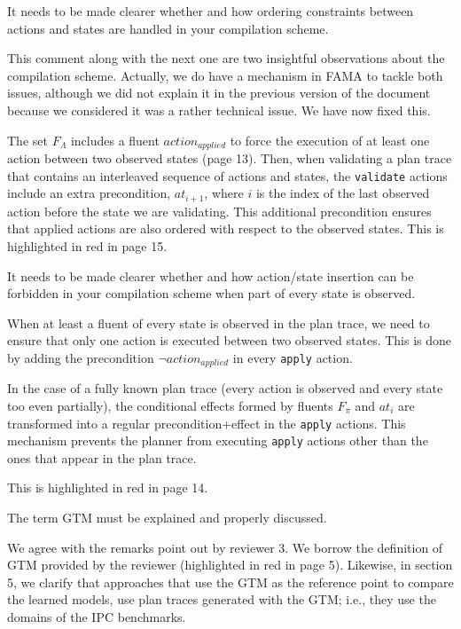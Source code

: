 \documentclass{article}
\newcommand{\FAMA}{{\small {\sffamily FAMA}}\xspace}
\begin{document}
\vspace{0.1cm}

\begin{mdframed} [hidealllines=true,backgroundcolor=gray!20]
It needs to be made clearer whether and how ordering constraints between actions and states are handled in your compilation scheme.
\end{mdframed}

This comment along with the next one are two insightful observations about the compilation scheme. Actually, we do have a mechanism in \FAMA to tackle both issues, although we did not explain it in the previous version of the document because we considered it was a rather technical issue. We have now fixed this.

The set $F_{\Lambda}$ includes a fluent $action_{applied}$ to force the execution of at least one action between two observed states (page 13). Then, when validating a plan trace that contains an interleaved sequence of actions and states, the \texttt{validate} actions include an extra precondition, $at_{i+1}$, where $i$ is the index of the last observed action before the state we are validating. This additional precondition ensures that applied actions are also ordered with respect to the observed states. This is highlighted in red in page 15.

\vspace{0.1cm}


\begin{mdframed} [hidealllines=true,backgroundcolor=gray!20]
It needs to be made clearer whether and how action/state insertion can be forbidden in your compilation scheme when part of every state is observed.
\end{mdframed}


When at least a fluent of every state is observed in the plan trace, we need to ensure that only one action is executed between two observed states. This is done by adding the precondition $\neg action_{applied}$ in every \texttt{apply} action. 

In the case of a fully known plan trace (every action is observed and every state too even partially), the conditional effects formed by fluents $F_{\pi}$ and $at_i$ are transformed into a regular precondition+effect in the \texttt{apply} actions. This mechanism prevents the planner from executing  \texttt{apply} actions other than the ones that appear in the plan trace.

This is highlighted in red in page 14.


\begin{mdframed} [hidealllines=true,backgroundcolor=gray!20]
The term GTM must be explained and properly discussed.
\end{mdframed}

We agree with the remarks point out by reviewer 3. We borrow the definition of GTM provided by the reviewer (highlighted in red in page 5). Likewise, in section 5, we clarify that approaches that use the GTM as the reference point to compare the learned models, use plan traces generated with the GTM; i.e., they  use the domains of the IPC benchmarks.
\end{document}
